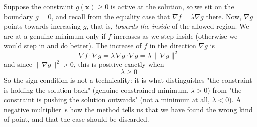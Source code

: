 \documentclass[]{article}
\begin{document}
	Suppose the constraint $g(\mathbf{x}) \geq 0$ is active at the solution, so we sit on the boundary $g = 0$, and recall from the equality case that $\nabla f = \lambda \nabla g$ there.
	Now, $\nabla g$ points towards increasing $g$, that is, \textit{towards the inside} of the allowed region.
	We are at a genuine minimum only if $f$ increases as we step inside (otherwise we would step in and do better).
	The increase of $f$ in the direction $\nabla g$ is
	$$
	\nabla f \cdot \nabla g = \lambda \, \nabla g \cdot \nabla g = \lambda \, \|\nabla g\|^2
	$$
	and since $\|\nabla g\|^2 > 0$, this is positive exactly when
	$$
	\lambda \geq 0
	$$
	So the sign condition is not a technicality: it is what distinguishes "the constraint is holding the solution back" (genuine constrained minimum, $\lambda > 0$) from "the constraint is pushing the solution outwards" (not a minimum at all, $\lambda < 0$).
	A negative multiplier is how the method tells us that we have found the wrong kind of point, and that the case should be discarded.
\end{document}
